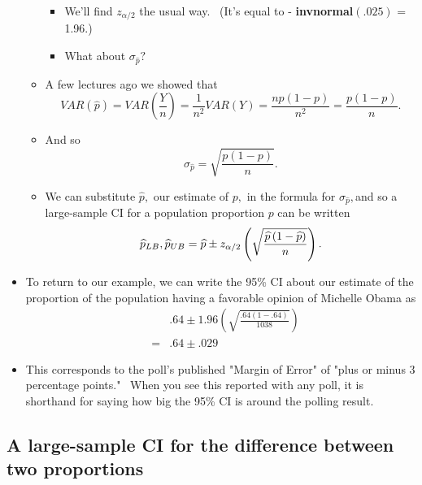 \documentclass[11pt]{article}
\begin{document}
\begin{itemize}
\begin{itemize}
\begin{itemize}
\item We'll find $z_{\alpha /2}$ the usual way. \ (It's equal to - \textbf{%
invnormal}$\left( .025\right) $ = 1.96.)

\item What about $\sigma _{\widehat{p}}?$
\end{itemize}

\item A few lectures ago we showed that%
\begin{equation*}
VAR\left( \widehat{p}\right) =VAR\left( \frac{Y}{n}\right) =\frac{1}{n^{2}}%
VAR\left( Y\right) =\frac{np\left( 1-p\right) }{n^{2}}=\frac{p\left(
1-p\right) }{n}.
\end{equation*}

\item And so%
\begin{equation*}
\sigma _{\widehat{p}}=\sqrt{\frac{p\left( 1-p\right) }{n}}.
\end{equation*}

\item We can substitute $\widehat{p},$ our estimate of $p,$ in the formula
for $\sigma _{\widehat{p}},$and so a large-sample CI for a population
proportion $p$ can be written%
\begin{equation*}
\widehat{p}_{LB},\widehat{p}_{UB}=\widehat{p}\pm z_{\alpha /2}\left( \sqrt{%
\frac{\widehat{p}\left( 1-\widehat{p}\right) }{n}}\right) .
\end{equation*}
\end{itemize}

\item To return to our example, we can write the 95\% CI about our estimate
of the proportion of the population having a favorable opinion of Michelle
Obama as 
\begin{eqnarray*}
&&.64\pm 1.96\left( \sqrt{\frac{.64\left( 1-.64\right) }{1038}}\right)  \\
&=&.64\pm .029
\end{eqnarray*}

\item This corresponds to the poll's published "Margin of Error" of "plus or
minus 3 percentage points." \ When you see this reported with any poll, it
is shorthand for saying how big the 95\% CI is around the polling result.
\end{itemize}

\subsection{A large-sample CI for the difference between two proportions}
\end{document}
